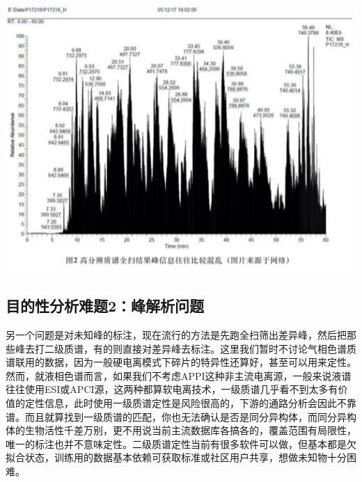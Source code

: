 \documentclass[]{book}
\begin{document}
\includegraphics[width=6.67in]{images/expo2}

\hypertarget{ux76eeux7684ux6027ux5206ux6790ux96beux98982ux5cf0ux89e3ux6790ux95eeux9898}{%
\subsection{目的性分析难题2：峰解析问题}\label{ux76eeux7684ux6027ux5206ux6790ux96beux98982ux5cf0ux89e3ux6790ux95eeux9898}}

另一个问题是对未知峰的标注，现在流行的方法是先跑全扫筛出差异峰，然后把那些峰去打二级质谱，有的则直接对差异峰去标注。这里我们暂时不讨论气相色谱质谱联用的数据，因为一般硬电离模式下碎片的特异性还算好，甚至可以用来定性。然而，就液相色谱而言，如果我们不考虑APPI这种非主流电离源，一般来说液谱往往使用ESI或APCI源，这两种都算软电离技术，一级质谱几乎看不到太多有价值的定性信息，此时使用一级质谱定性是风险很高的，下游的通路分析会因此不靠谱。而且就算找到一级质谱的匹配，你也无法确认是否是同分异构体，而同分异构体的生物活性千差万别，更不用说当前主流数据库各搞各的，覆盖范围有局限性，唯一的标注也并不意味定性。二级质谱定性当前有很多软件可以做，但基本都是欠拟合状态，训练用的数据基本依赖可获取标准或社区用户共享，想做未知物十分困难。
\end{document}
